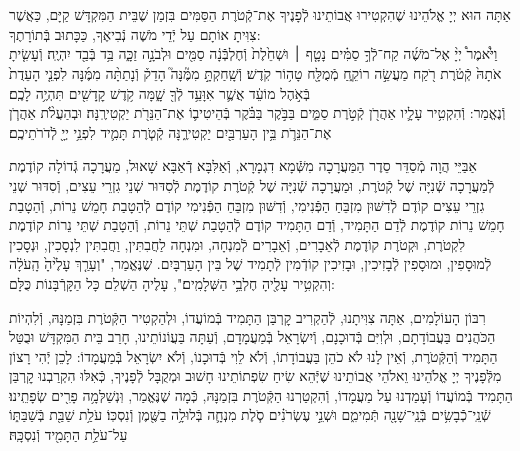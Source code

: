 \documentclass[twoside, openany, parskip=half, 11pt]{book}
\begin{document}
\newcommand{\ketoret}{
אַתָּה הוּא יְיָ אֱלֹהֵינוּ שֶׁהִקְטִירוּ אֲבוֹתֵינוּ לְֿפָנֶיךָ אֶת־קְֿטֹרֶת הַסַּמִּים בִּזְמַן שֶׁבֵּית הַמִּקְדָּשׁ קַיָּם, כַּאֲשֶׁר צִוִּיתָ אוֹתָם עַל יְֿדֵי מֹשֶׁה נְֿבִיאֶךָ, כַּכָּתוּב בְּֿתוֹרָתֶךָ:\\
וַיֹּ֩אמֶר֩ יְיָ֨ אֶל־מֹשֶׁ֜ה קַח־לְֿךָ֣ סַמִּ֗ים\source{שמות ל} נָטָ֤ף ׀ וּשְׁחֵ֙לֶת֙ וְֿחֶלְבְּֿֿנָ֔ה סַמִּ֖ים וּלְבֹנָ֣ה זַכָּ֑ה בַּ֥ד בְּֿבַ֖ד יִהְיֶֽה׃ וְֿעָשִׂ֤יתָ אֹתָהּ֙ קְֿטֹ֔רֶת רֹ֖קַח מַעֲשֵׂ֣ה רוֹקֵ֑חַ מְֿמֻלָּ֖ח טָה֥וֹר קֹֽדֶשׁ׃ וְֿשָֽׁחַקְתָּ֣ מִמֶּ֘נָּה֮ הָדֵק֒ וְֿנָתַתָּ֨ה מִמֶּ֜נָּה לִפְנֵ֤י הָעֵדֻת֙ בְּֿאֹ֣הֶל מוֹעֵ֔ד אֲשֶׁ֛ר אִוָּעֵ֥ד לְֿךָ֖ שָׁ֑מָּה קֹ֥דֶשׁ קׇֽדָשִׁ֖ים תִּהְיֶ֥ה לָכֶֽם׃\\
וְֿנֶאֱמַר: וְֿהִקְטִ֥יר עָלָ֛יו אַהֲרֹ֖ן קְֿטֹ֣רֶת סַמִּ֑ים בַּבֹּ֣קֶר בַּבֹּ֗קֶר בְּֿהֵיטִיב֛וֹ אֶת־הַנֵּרֹ֖ת יַקְטִירֶֽנָּה׃ וּבְהַעֲלֹ֨ת אַהֲרֹ֧ן אֶת־הַנֵּרֹ֛ת בֵּ֥ין הָעַרְבַּ֖יִם יַקְטִירֶ֑נָּה קְֿטֹ֧רֶת תָּמִ֛יד לִפְנֵ֥י יְיָ֖ לְֿדֹרֹתֵיכֶֽם׃


}
\\
\tamid
\\
\ketoret
אַבַּיֵּי הֲוָה מְֿסַדֵּר סֵדֶר הַמַּעֲרָכָה  מִשְּֿׁמָא דִגְמָרָא, וְֿאַלִּבָּא דְֿאַבָּא שָׁאוּל, מַעֲרָכָה גְֿדוֹלָה קוֹדֶמֶת לְֿמַעֲרָכָה שְֿׁנִיָּה שֶׁל קְֿטֹרֶת, וּמַעֲרָכָה שְֿׁנִיָּה שֶׁל קְֿטֹרֶת קוֹדֶמֶת לְֿסִדּוּר שְׁנֵי גִזְרֵי עֵצִים, וְֿסִדּוּר שְׁנֵי גִזְרֵי עֵצִים קוֹדֶם לְֿדִשּׁוּן מִזְבֵּחַ הַפְּֿנִימִי, וְֿדִשּׁוּן מִזְבֵּחַ הַפְּֿנִימִי קוֹדֶם לְֿהַטָבַת חָמֵשׁ נֵרוֹת, וְֿהַטָבַת חָמֵשׁ נֵרוֹת קוֹדֶמֶת לְֿדַם הַתָּמִיד, וְֿדַם הַתָּמִיד קוֹדֶם לְֿהַטָבַת שְׁתֵּי נֵרוֹת, וְֿהַטָבַת שְׁתֵּי נֵרוֹת קוֹדֶמֶת לִקְטֹרֶת, וּקְטֹרֶת קוֹדֶמֶת לְֿאֵבָרִים, וְֿאֵבָרִים לְֿמִנְחָה, וּמִנְחָה לַחֲבִתִּין, וַחֲבִתִּין לִנְסָכִין, וּנְסָכִין לְֿמוּסָפִין, וּמוּסָפִין לְֿבָזִיכִין, וּבָזִיכִין קוֹדְֿמִין לְֿתָמִיד שֶׁל בֵּין הָעַרְבָּיִם. שֶׁנֶּאֱמַר, "וְעָרַ֤ךְ  עָלֶ֙יהָ֙ הָֽעֹלָ֔ה וְהִקְטִ֥יר עָלֶ֖יהָ חֶלְבֵ֥י הַשְּׁלָמִֽים׃", עָלֶיהָ הַשְׁלֵם כָּל הַקָּרְֿבָּנוֹת כֻּלָּם:

רִבּוֹן הָעוֹלָמִים, אַתָּה צִוִּיתָנוּ, לְֿהַקְרִיב קׇרְבַּן הַתָּמִיד בְּֿמוֹעֲדוֹ, וּלְהַקְטִיר הַקְּֿטֹרֶת בִּזְמַנָּהּ, וְֿלִהְיוֹת הַכֹּהֲנִים בַּעֲבוֹדָתָם, וּלְוִיִּם בְּֿדוּכָנָם, וְֿיִשְׂרָאֵל בְּֿמַעֲמָדָם, וְֿעַתָּה בַּעֲוֹנוֹתֵינוּ, חָרַב בֵּית הַמִּקְדָּשׁ וּבֻטַּל הַתָּמִיד וְֿהַקְּֿטֹרֶת, וְֿאֵין לָנוּ לֹא כֹהֵן בַּעֲבוֹדָתוֹ, וְֿלֹא לֵוִי בְּֿדוּכָנוֹ, וְֿלֹא יִשְׂרָאֵל בְּֿמַעֲמָדוֹ: לָכֵן יְֿהִי רָצוֹן מִלְּֿפָנֶיךָ יְיָ אֱלֹהֵינוּ וֵאלֹהֵי אֲבוֹתֵינוּ שֶׁיְּֿהֵא שִׂיחַ שִׂפְתוֹתֵינוּ חָשׁוּב וּמְקֻבָּל לְֿפָנֶיךָ, כְּֿאִלּוּ הִקְרַבְנוּ קׇרְבַּן הַתָּמִיד בְּֿמוֹעֲדוֹ וְֿעָמַדְנוּ עַל מַעֲמָדוֹ, וְֿהִקְטַרְנוּ הַקְּֿטֹרֶת בִּזְמַנָּהּ, כְּֿמָה שֶׁנֶּאֱמַר, וּֽנְשַׁלְּמָ֥ה  פָרִ֖ים שְׂפָתֵֽינוּ׃\\
\shabbos
{}
 שְֿׁנֵֽי־כְֿֿבָשִׂ֥ים בְּֿנֵֽי־שָׁנָ֖ה תְּֿמִימִ֑ם וּשְׁנֵ֣י עֶשְׂרֹנִ֗ים סֹ֧לֶת מִנְחָ֛ה בְּֿלוּלָ֥ה בַשֶּׁ֖מֶן וְֿנִסְכּֽוֹ׃
 עֹלַ֥ת שַׁבַּ֖ת בְּֿשַׁבַּתּ֑וֹ עַל־עֹלַ֥ת הַתָּמִ֖יד וְֿנִסְכָּֽהּ׃
\end{document}
